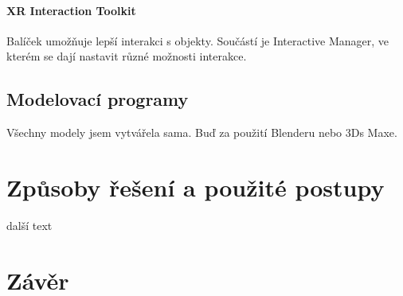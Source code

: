 \documentclass[12pt, a4paper,
twoside,        %
openright
]{report}
\begin{document}
\subsubsection{XR Interaction Toolkit}
Balíček umožňuje lepší interakci s objekty. Součástí je Interactive Manager, ve kterém se dají nastavit různé možnosti interakce. 



\section{Modelovací programy}
\label{sec:Modelovaci_programy}

Všechny modely jsem vytvářela sama. Buď za použití Blenderu nebo 3Ds Maxe. 




\chapter{Způsoby řešení a použité postupy}	
	další text
	

	

	
\chapter*{Závěr}
\end{document}
